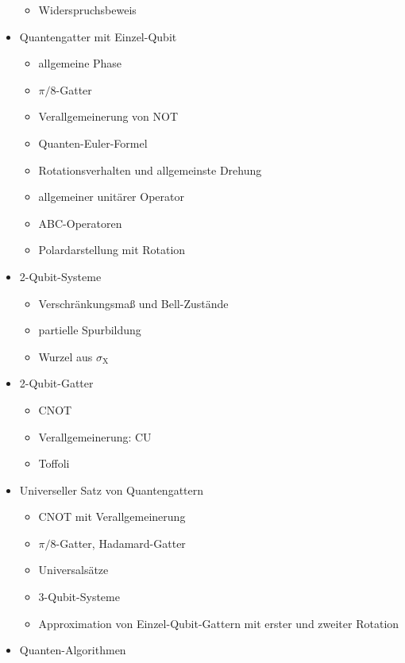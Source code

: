 \documentclass[9pt]{article}
\begin{document}
\begin{multicols}{2}
\begin{itemize}
\begin{itemize}
          \item Widerspruchsbeweis
        \end{itemize}
      \item Quantengatter mit Einzel-Qubit
        \begin{itemize}
          \item allgemeine Phase
          \item $\pi/8$-Gatter
          \item Verallgemeinerung von NOT
          \item Quanten-Euler-Formel
          \item Rotationsverhalten und allgemeinste Drehung
          \item allgemeiner unitärer Operator
          \item ABC-Operatoren
          \item Polardarstellung mit Rotation
        \end{itemize}
      \item 2-Qubit-Systeme
        \begin{itemize}
          \item Verschränkungsmaß und Bell-Zustände
          \item partielle Spurbildung
          \item Wurzel aus $\sigma_\mathrm{X}$
        \end{itemize}
      \item 2-Qubit-Gatter
        \begin{itemize}
          \item CNOT
          \item Verallgemeinerung: CU
          \item Toffoli
        \end{itemize}
      \item Universeller Satz von Quantengattern
        \begin{itemize}
          \item CNOT mit Verallgemeinerung
          \item $\pi/8$-Gatter, Hadamard-Gatter
          \item Universalsätze
          \item 3-Qubit-Systeme
          \item Approximation von Einzel-Qubit-Gattern mit erster und zweiter Rotation
        \end{itemize}
      \item Quanten-Algorithmen
        \begin{itemize}

\end{itemize}
\end{itemize}
\end{multicols}
\end{document}
